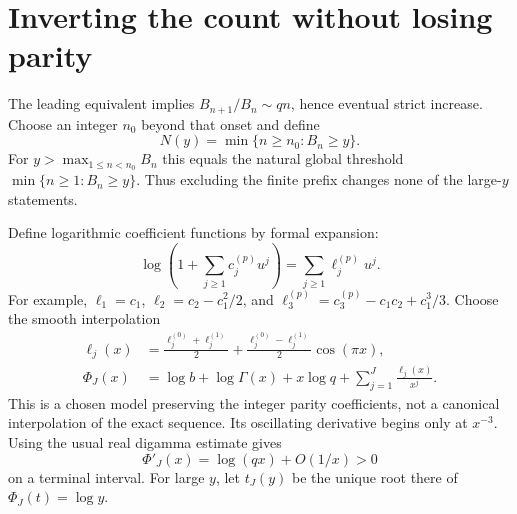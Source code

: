 \documentclass[11pt,letterpaper]{article}
\theoremstyle{remark}\newtheorem{remark}[theorem]{Remark}
\begin{document}
\section{Inverting the count without losing parity}\label{bsh:sec:inverse}
The leading equivalent implies $B_{n+1}/B_n\sim qn$, hence eventual strict increase. Choose an integer $n_0$ beyond that onset and define
\[
 N(y)=\min\{n\geq n_0:B_n\geq y\}.
\]
For $y>\max_{1\leq n<n_0}B_n$ this equals the natural global threshold $\min\{n\geq1:B_n\geq y\}$. Thus excluding the finite prefix changes none of the large-$y$ statements.

Define logarithmic coefficient functions by formal expansion:
\begin{equation}\label{bsh:eq:logcoeff}
 \log\left(1+\sum_{j\geq1}c_j^{(p)}u^j\right)
 =\sum_{j\geq1}\ell_j^{(p)}u^j.
\end{equation}
For example, $\ell_1=c_1$, $\ell_2=c_2-c_1^2/2$, and $\ell_3^{(p)}=c_3^{(p)}-c_1c_2+c_1^3/3$. Choose the smooth interpolation
\begin{align}
 \ell_j(x)&=\frac{\ell_j^{(0)}+\ell_j^{(1)}}2
       +\frac{\ell_j^{(0)}-\ell_j^{(1)}}2\cos(\pi x),\label{bsh:eq:cosine}\\
 \Phi_J(x)&=\log b+\log\Gamma(x)+x\log q
                +\sum_{j=1}^J\frac{\ell_j(x)}{x^j}.\label{bsh:eq:Phi}
\end{align}
This is a chosen model preserving the integer parity coefficients, not a canonical interpolation of the exact sequence. Its oscillating derivative begins only at $x^{-3}$. Using the usual real digamma estimate gives
\begin{equation}\label{bsh:eq:Phideriv}
 \Phi'_J(x)=\log(qx)+O(1/x)>0
\end{equation}
on a terminal interval. For large $y$, let $t_J(y)$ be the unique root there of $\Phi_J(t)=\log y$.
\end{document}
